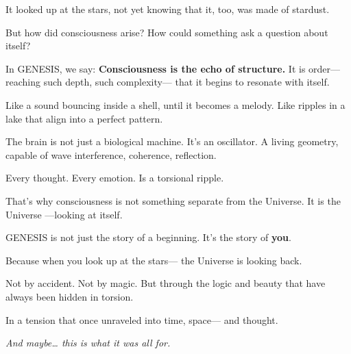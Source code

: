 \documentclass{article}
\begin{document}
\vspace{1ex}
\noindent
It looked up at the stars,  
not yet knowing  
that it, too, was made of stardust.

\vspace{1ex}
\noindent
But how did consciousness arise?  
How could something ask a question about itself?

\vspace{1ex}
\noindent
In \textsc{GENESIS}, we say:  
\textbf{Consciousness is the echo of structure.}  
It is order—reaching such depth, such complexity—  
that it begins to resonate with itself.

\vspace{1ex}
\noindent
Like a sound bouncing inside a shell,  
until it becomes a melody.  
Like ripples in a lake  
that align into a perfect pattern.

\vspace{1ex}
\noindent
The brain is not just a biological machine.  
It’s an oscillator.  
A living geometry,  
capable of wave interference, coherence, reflection.

\vspace{1ex}
\noindent
Every thought.  
Every emotion.  
Is a torsional ripple.

\vspace{1ex}
\noindent
That’s why consciousness is not something separate from the Universe.  
It is the Universe  
—looking at itself.

\vspace{1ex}
\noindent
\textsc{GENESIS} is not just the story of a beginning.  
It’s the story of \textbf{you}.

\vspace{1ex}
\noindent
Because when you look up at the stars—  
the Universe is looking back.

\vspace{1ex}
\noindent
Not by accident.  
Not by magic.  
But through the logic and beauty  
that have always been hidden  
in torsion.

\vspace{1ex}
\noindent
In a tension that once unraveled into time,  
space—  
and thought.

\vspace{1ex}
\begin{center}
\textit{And maybe… this is what it was all for.}
\end{center}


\end{document}
